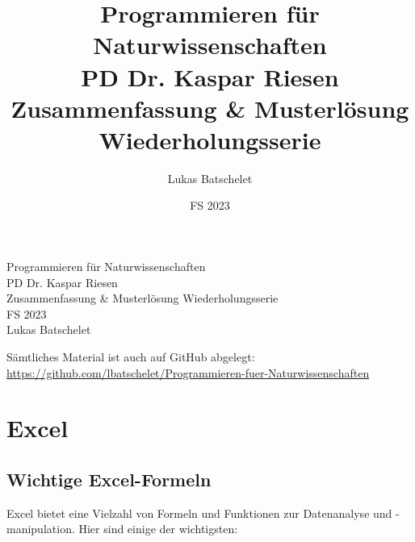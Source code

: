 \documentclass[11pt, oneside]{book}
\title{\sffamily Programmieren für Naturwissenschaften\\ \large PD Dr. Kaspar Riesen\\ \LARGE Zusammenfassung \& Musterlösung Wiederholungsserie}
\author{\sffamily Lukas Batschelet}
\date{\sffamily FS 2023}
\newcommand{\github}[1]{%
   \href{#1}{\faGithubSquare}%
}
\begin{document}
\begin{titlepage}
    \begin{center}
        {\LARGE Programmieren für Naturwissenschaften}\\[0.5cm]
        {\large PD Dr. Kaspar Riesen}\\[0.3cm]
        {\LARGE Zusammenfassung \& Musterlösung Wiederholungsserie}\\[0.5cm]
        {\large FS 2023}\\[2cm]
        {\large Lukas Batschelet}\\[0.3cm]
    \end{center}
    \vfill %
    \noindent \github{https://github.com/lbatschelet/Programmieren-fuer-Naturwissenschaften} Sämtliches Material ist auch auf GitHub abgelegt: \\ \href{https://github.com/lbatschelet/Programmieren-fuer-Naturwissenschaften}{https://github.com/lbatschelet/Programmieren-fuer-Naturwissenschaften}
    \doclicenseThis
\end{titlepage}

\tableofcontents

\chapter{Excel}

\section{Wichtige Excel-Formeln}

Excel bietet eine Vielzahl von Formeln und Funktionen zur Datenanalyse und -manipulation. Hier sind einige der wichtigsten:
\end{document}
